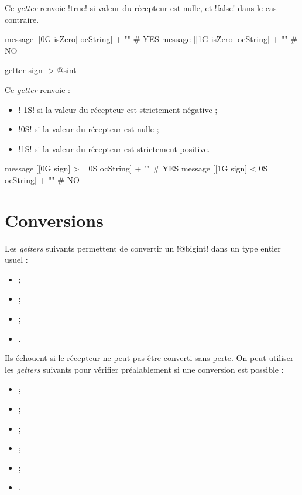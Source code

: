 Ce \emph{getter} renvoie \ggs!true! si valeur du récepteur est nulle, et \ggs!false! dans le cas contraire.

\begin{galgas}
message [[0G isZero] ocString] + "\n" # YES
message [[1G isZero] ocString] + "\n" # NO
\end{galgas}




\begin{galgasbox}
getter sign -> @sint
\end{galgasbox}

Ce \emph{getter} renvoie :
\begin{itemize}
\item \ggs!-1S! si la valeur du récepteur est strictement négative ;
\item \ggs!0S! si la valeur du récepteur est nulle ;
\item \ggs!1S! si la valeur du récepteur est strictement positive.
\end{itemize}

\begin{galgas}
message [[0G sign] >= 0S ocString] + "\n" # YES
message [[1G sign] < 0S ocString] + "\n" # NO
\end{galgas}











\section{Conversions}


Les \emph{getters} suivants permettent de convertir un \ggs!@bigint! dans un type entier usuel :
\begin{itemize}
  \item {} ;
  \item {} ;
  \item {} ;
  \item {}.
\end{itemize}

Ils échouent si le récepteur ne peut pas être converti sans perte. On peut utiliser les \emph{getters} suivants pour vérifier préalablement si une conversion est possible :
\begin{itemize}
  \item {} ;
  \item {} ;
  \item {} ;
  \item {} ;
  \item {} ;
  \item {}.
\end{itemize}

